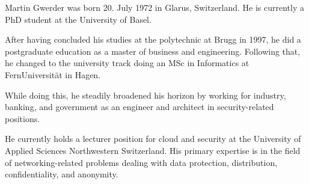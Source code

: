 
Martin Gwerder was born 20. July 1972 in Glarus, Switzerland. He is currently a PhD student at the University of Basel. 

After having concluded his studies at the polytechnic at Brugg in 1997, he did a postgraduate education as a master of business and engineering. Following that, he changed to the university track doing an MSc in Informatics at FernUniversit\"at in Hagen. 

While doing this, he steadily broadened his horizon by working for industry, banking, and government as an engineer and architect in security-related positions. 

He currently holds a lecturer position for cloud and security at the University of Applied Sciences Northwestern Switzerland. His primary expertise is in the field of networking-related problems dealing with data protection, distribution, confidentiality, and anonymity.